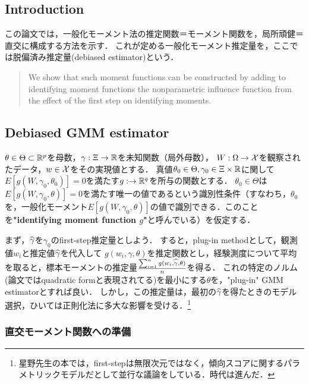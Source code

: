 \documentclass[uplatex,dvipdfmx]{jsreport}
\begin{document}
\subsection{Introduction}

この論文では，一般化モーメント法の推定関数＝モーメント関数を，局所頑健＝直交に構成する方法を示す．
これが定める一般化モーメント推定量を，ここでは脱偏済み推定量(debiased estimator)という．
\begin{quote}
    We show that such moment functions can be constructed by adding
    to identifying moment functions the nonparametric influence function from the effect of the
    first step on identifying moments.
\end{quote}

\subsection{Debiased GMM estimator}

\begin{notation}
    $\theta\in\Theta\subset\mathbb{R}^p$を母数，$\gamma:\Xi\to\mathbb{R}$を未知関数（局外母数），
    $W:\Omega\to\mathcal{X}$を観察されたデータ，$w\in\mathcal{X}$をその実現値とする．
    真値$\theta_0\in\Theta,\gamma_0\in\Xi\times\mathbb{R}$に関して$E[g(W,\gamma_0,\theta_0)]=0$を満たす$g:\to\mathbb{R}^q$を所与の関数とする．
    $\theta_0\in\Theta$は$E[g(W,\gamma_0,\theta)]=0$を満たす唯一の値であるという識別性条件（すなわち，$\theta_0$を，一般化モーメント$E[g(W,\gamma_0,\theta)]$の値で識別できる．このことを\textbf{"identifying moment function $g$"}と呼んでいる）を仮定する．
\end{notation}

\begin{discussion}
    まず，$\widehat{\gamma}$を$\gamma_0$のfirst-step推定量としよう．
    すると，plug-in methodとして，観測値$w_i$と推定値$\widehat{\gamma}$を代入して
    $g(w_i,\gamma,\theta)$を推定関数とし，経験測度について平均を取ると，標本モーメントの推定量$\frac{\sum_{i=1}^ng(w_i,\widehat{\gamma},\theta)}{n}$を得る．
    これの特定のノルム(論文ではquadratic formと表現されてる)を最小にする$\theta$を，"plug-in" GMM estimatorとすれば良い．
    しかし，この推定量は，最初の$\widehat{\gamma}$を得たときのモデル選択，ひいては正則化法に多大な影響を受ける．\footnote{星野先生の本では，first-stepは無限次元ではなく，傾向スコアに関するパラメトリックモデルだとして並行な議論をしている．時代は進んだ．}
\end{discussion}

\subsubsection{直交モーメント関数への準備}
\end{document}
